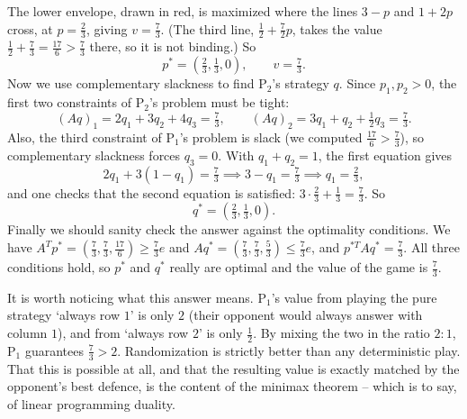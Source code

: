 \begin{example}
    The lower envelope, drawn in red, is maximized where the lines $3 - p$ and $1 + 2p$ cross, at $p = \frac23$, giving $v = \frac73$. (The third line, $\frac12 + \frac72 p$, takes the value $\frac12 + \frac73 = \frac{17}{6} > \frac73$ there, so it is not binding.) So
    $$
    p^* = \left(\tfrac23, \tfrac13, 0\right), \qquad v = \tfrac73.
    $$
    Now we use complementary slackness to find $\mathrm{P}_2$'s strategy $q$. Since $p_1, p_2 > 0$, the first two constraints of $\mathrm{P}_2$'s problem must be tight:
    $$
    (Aq)_1 = 2q_1 + 3q_2 + 4q_3 = \tfrac73, \qquad (Aq)_2 = 3q_1 + q_2 + \tfrac12 q_3 = \tfrac73.
    $$
    Also, the third constraint of $\mathrm{P}_1$'s problem is slack (we computed $\frac{17}{6} > \frac73$), so complementary slackness forces $q_3 = 0$. With $q_1 + q_2 = 1$, the first equation gives
    $$
    2q_1 + 3(1 - q_1) = \tfrac73 \implies 3 - q_1 = \tfrac73 \implies q_1 = \tfrac23,
    $$
    and one checks that the second equation is satisfied: $3\cdot\frac23 + \frac13 = \frac73$. So
    $$
    q^* = \left(\tfrac23, \tfrac13, 0\right).
    $$
    Finally we should sanity check the answer against the optimality conditions. We have $A^Tp^* = \left(\frac73, \frac73, \frac{17}{6}\right) \geq \frac73 e$ and $Aq^* = \left(\frac73, \frac73, \frac53\right) \leq \frac73 e$, and $p^{*T}Aq^* = \frac73$. All three conditions hold, so $p^*$ and $q^*$ really are optimal and the value of the game is $\frac73$.
\end{example}

\begin{remark}
    It is worth noticing what this answer means. $\mathrm{P}_1$'s value from playing the pure strategy `always row $1$' is only $2$ (their opponent would always answer with column $1$), and from `always row $2$' is only $\frac12$. By mixing the two in the ratio $2:1$, $\mathrm{P}_1$ guarantees $\frac73 > 2$. Randomization is strictly better than any deterministic play. That this is possible at all, and that the resulting value is exactly matched by the opponent's best defence, is the content of the minimax theorem -- which is to say, of linear programming duality.
\end{remark}


